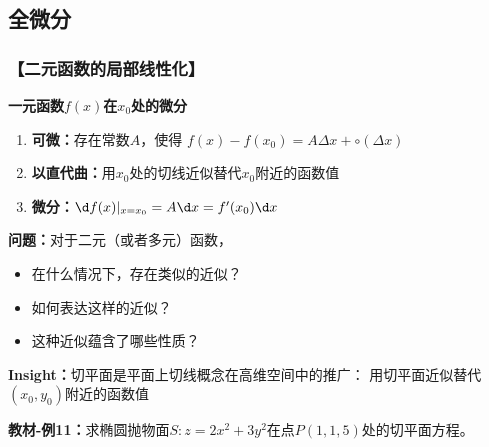 \subsection{全微分}

\subsubsection{【二元函数的局部线性化】}

\begin{shaded}
	{\bf 一元函数$f(x)$在$x_0$处的微分}
	
	\begin{enumerate}[(1)]
  	  \setlength{\itemindent}{1cm}
	  \item {\bf 可微：}存在常数$A$，使得
	  $f(x)-f(x_0)=A\Delta x+\circ(\Delta x)$
	  \item {\bf 以直代曲：}用$x_0$处的切线近似替代$x_0$附近的函数值 
	  \item {\bf 微分：}$\d f(x)|_{x=x_0}=A\d x=f'(x_0)\d x$
	\end{enumerate}
\end{shaded}

{\bf 问题：}对于二元（或者多元）函数， 
\begin{itemize}
  \item 在什么情况下，存在类似的近似？
  \item 如何表达这样的近似？ 
  \item 这种近似蕴含了哪些性质？
\end{itemize}

{\bf Insight：}切平面是平面上切线概念在高维空间中的推广：
用切平面近似替代$(x_0,y_0)$附近的函数值

{\bf 教材-例11：}求椭圆抛物面$S:z=2x^2+3y^2$在点$P(1,1,5)$处的切平面方程。

